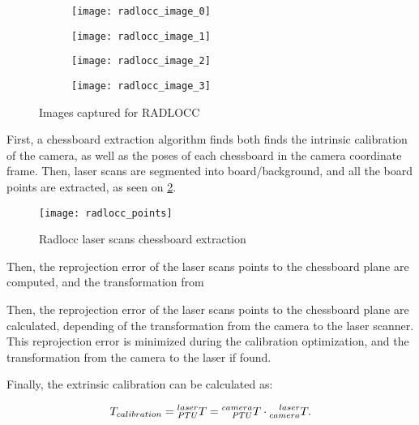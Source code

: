 \begin{figure}
    
    \centering
    \begin{subfigure}{0.5\textwidth}
        \centering
        \texttt{[image: radlocc\_image\_0]}
    \end{subfigure}%
    \begin{subfigure}{0.5\textwidth}
        \centering
        \texttt{[image: radlocc\_image\_1]}
    \end{subfigure}%

    \vspace{1cm}
    
    \begin{subfigure}{0.5\textwidth}
        \centering
        \texttt{[image: radlocc\_image\_2]}
    \end{subfigure}%
    \begin{subfigure}{0.5\textwidth}
        \centering
        \texttt{[image: radlocc\_image\_3]}
    \end{subfigure}%

    \caption{Images captured for RADLOCC}
    \label{figure:radlocc-images}
\end{figure}

First, a chessboard extraction algorithm finds both finds the intrinsic calibration of the camera, as well as the poses of each chessboard in the camera coordinate frame. Then, laser scans are segmented into board/background, and all the board points are extracted, as seen on \cref{figure:radlocc-points}.

\begin{figure}
    \centering
    \texttt{[image: radlocc\_points]}
    \caption{Radlocc laser scans chessboard extraction}
    \label{figure:radlocc-points}
\end{figure}

Then, the reprojection error of the laser scans points to the chessboard plane are computed, and the transformation from 

Then, the reprojection error of the laser scans points to the chessboard plane are calculated, depending of the transformation from the camera to the laser scanner. This reprojection error is minimized during the calibration optimization, and the transformation from the camera to the laser if found.

Finally, the extrinsic calibration can be calculated as:

\begin{equation}
    \label{eqn:radlocc-full-calibration}
    T_{calibration} = \TF{PTU}{laser} = \TF{PTU}{camera} \cdot \TF{camera}{laser}.
\end{equation}

